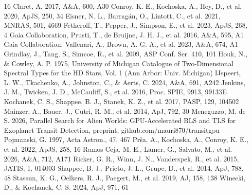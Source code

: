 \documentclass[RNAAS]{aastex631}
\begin{document}
\begin{thebibliography}{16}
 Claret, A. 2017, A\&A, 600, A30
 Conroy, K. E., Kochoska, A., Hey, D., et al. 2020, ApJS, 250, 34
 Eisner, N. L., Barrag\'an, O., Lintott, C., et al. 2021, MNRAS, 501, 4669
 Fetherolf, T., Pepper, J., Simpson, E., et al. 2023, ApJS, 268, 4
 Gaia Collaboration, Prusti, T., de Bruijne, J. H. J., et al. 2016, A\&A, 595, A1
 Gaia Collaboration, Vallenari, A., Brown, A. G. A., et al. 2023, A\&A, 674, A1
 Grindlay, J., Tang, S., Simcoe, R., et al. 2009, ASP Conf. Ser. 410, 101
 Houk, N., \& Cowley, A. P. 1975, University of Michigan Catalogue of Two-Dimensional Spectral Types for the HD Stars, Vol. 1 (Ann Arbor: Univ. Michigan)
 IJspeert, L. W., Tkachenko, A., Johnston, C., \& Aerts, C. 2024, A\&A, 691, A242
 Jenkins, J. M., Twicken, J. D., McCauliff, S., et al. 2016, Proc. SPIE, 9913, 99133E
 Kochanek, C. S., Shappee, B. J., Stanek, K. Z., et al. 2017, PASP, 129, 104502
 Mainzer, A., Bauer, J., Cutri, R. M., et al. 2014, ApJ, 792, 30
 Meneguzzo, M. de S. 2026, Parallel Search for Alien Worlds: GPU-Accelerated BLS and TLS for Exoplanet Transit Detection, preprint, github.com/mauri870/transitgpu
 Pojmanski, G. 1997, Acta Astron., 47, 467
 Pr\v{s}a, A., Kochoska, A., Conroy, K. E., et al. 2022, ApJS, 258, 16
 Ramos-Ceja, M. E., Lamer, G., Salvato, M., et al. 2026, A\&A, 712, A171
 Ricker, G. R., Winn, J. N., Vanderspek, R., et al. 2015, JATIS, 1, 014003
 Shappee, B. J., Prieto, J. L., Grupe, D., et al. 2014, ApJ, 788, 48
 Stassun, K. G., Oelkers, R. J., Paegert, M., et al. 2019, AJ, 158, 138
 Winecki, D., \& Kochanek, C. S. 2024, ApJ, 971, 61
\end{thebibliography}
\end{document}
